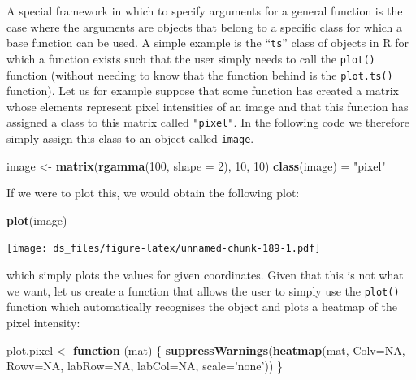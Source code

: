 \documentclass[12pt,]{krantz}
\newenvironment{Shaded}{\begin{snugshade}}{\end{snugshade}}
\newcommand{\KeywordTok}[1]{\textcolor[rgb]{0.27,0.27,0.27}{\textbf{#1}}}
\newcommand{\DataTypeTok}[1]{\textcolor[rgb]{0.27,0.27,0.27}{#1}}
\newcommand{\DecValTok}[1]{\textcolor[rgb]{0.06,0.06,0.06}{#1}}
\newcommand{\StringTok}[1]{\textcolor[rgb]{0.5,0.5,0.5}{#1}}
\newcommand{\OtherTok}[1]{\textcolor[rgb]{0.37,0.37,0.37}{#1}}
\newcommand{\ControlFlowTok}[1]{\textcolor[rgb]{0.27,0.27,0.27}{\textbf{#1}}}
\newcommand{\NormalTok}[1]{#1}
\begin{document}
A special framework in which to specify arguments for a general function
is the case where the arguments are objects that belong to a specific
class for which a base function can be used. A simple example is the
``\texttt{ts}'' class of objects in R for which a function exists such
that the user simply needs to call the \texttt{plot()} function (without
needing to know that the function behind is the \texttt{plot.ts()}
function). Let us for example suppose that some function has created a
matrix whose elements represent pixel intensities of an image and that
this function has assigned a class to this matrix called
\texttt{"pixel"}. In the following code we therefore simply assign this
class to an object called \texttt{image}.

\begin{Shaded}
\begin{Highlighting}[]
\NormalTok{image <-}\StringTok{ }\KeywordTok{matrix}\NormalTok{(}\KeywordTok{rgamma}\NormalTok{(}\DecValTok{100}\NormalTok{, }\DataTypeTok{shape =} \DecValTok{2}\NormalTok{), }\DecValTok{10}\NormalTok{, }\DecValTok{10}\NormalTok{)}
\KeywordTok{class}\NormalTok{(image) =}\StringTok{ "pixel"}
\end{Highlighting}
\end{Shaded}

If we were to plot this, we would obtain the following plot:

\begin{Shaded}
\begin{Highlighting}[]
\KeywordTok{plot}\NormalTok{(image)}
\end{Highlighting}
\end{Shaded}

\texttt{[image: ds\_files/figure-latex/unnamed-chunk-189-1.pdf]}

which simply plots the values for given coordinates. Given that this is
not what we want, let us create a function that allows the user to
simply use the \texttt{plot()} function which automatically recognises
the object and plots a heatmap of the pixel intensity:

\begin{Shaded}
\begin{Highlighting}[]
\NormalTok{plot.pixel <-}\StringTok{ }\ControlFlowTok{function}\NormalTok{ (mat) \{}
  \KeywordTok{suppressWarnings}\NormalTok{(}\KeywordTok{heatmap}\NormalTok{(mat, }\DataTypeTok{Colv=}\OtherTok{NA}\NormalTok{, }\DataTypeTok{Rowv=}\OtherTok{NA}\NormalTok{, }\DataTypeTok{labRow=}\OtherTok{NA}\NormalTok{, }\DataTypeTok{labCol=}\OtherTok{NA}\NormalTok{, }\DataTypeTok{scale=}\StringTok{'none'}\NormalTok{))}
\NormalTok{\}}
\end{Highlighting}
\end{Shaded}
\end{document}
